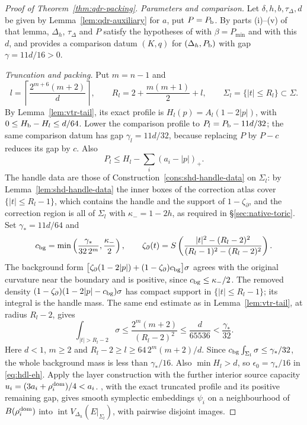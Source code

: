 \begin{proof}[Proof of Theorem~\ref{thm:qdr-packing}]
\emph{Parameters and comparison.} Let $\delta,h,b,\tau_\Delta,d$ be given by Lemma~\ref{lem:qdr-auxiliary} for $a$, put $P=P_{\mathrm b}$. By
parts (i)--(v) of that lemma, $\Delta_h$, $\tau_\Delta$ and $P$ satisfy the hypotheses of 
with $\beta=P_{\min}$ and with this $d$, and  provides a comparison datum $(K,q)$ for $(\Delta_h,P_{\mathrm b})$
with gap $\gamma=11d/16>0$.

\emph{Truncation and packing.} Put $m=n-1$ and
\[
 l=\left\lceil\frac{2^{m+6}(m+2)}d\right\rceil,\qquad
 R_l=2+\frac{m(m+1)}2+l,\qquad \Sigma_l=\{|t|\le R_l\}\subset\Sigma.
\]
By Lemma~\ref{lem:vtr-tail}, its exact profile is $H_l(p)=A_l(1-2|p|)$, with $0\le H_{\mathrm b}-H_l\le d/64$. Lower the comparison profile to
$P_l=P_{\mathrm b}-11d/32$; the same comparison datum has gap $\gamma_l=11d/32$, because replacing $P$ by $P-c$ reduces its gap by $c$. Also
\[
 P_l\le H_l-\sum_i(a_i-|p|)_+.
\]
The handle data are those of Construction~\ref{cons:shd-handle-data} on $\Sigma_l$: by Lemma~\ref{lem:shd-handle-data} the inner
boxes of the correction atlas cover $\{|t|\le R_l-1\}$, which contains the handle and the support of $1-\zeta_\partial$, and the
correction region is all of $\Sigma_l$ with $\kappa_-=1-2h$, as required in \S\ref{sec:native-toric}. Set $\gamma_*=11d/64$ and
\[
 c_{\rm bg}=\min\left(\frac{\gamma_*}{32\,2^m},\frac{\kappa_-}{2}\right),\qquad
 \zeta_\partial(t)=S\left(\frac{|t|^2-(R_l-2)^2}{(R_l-1)^2-(R_l-2)^2}\right).
\]
The background form $\big[\zeta_\partial(1-2|p|)+(1-\zeta_\partial)c_{\rm bg}\big]\sigma$ agrees with the original curvature near
the boundary and is positive, since $c_{\rm bg}\le\kappa_-/2$. The removed density $(1-\zeta_\partial)(1-2|p|-c_{\rm bg})\sigma$ has
compact support in $\{|t|\le R_l-1\}$; its integral is the handle mass. The same end estimate as in Lemma~\ref{lem:vtr-tail}, at
radius $R_l-2$, gives
\[
 \int_{|t|>R_l-2}\sigma\le\frac{2^m(m+2)}{(R_l-2)^2}
 \le\frac{d}{65536}<\frac{\gamma_*}{32}.
\]
Here $d<1$, $m\ge2$ and $R_l-2\ge l\ge64\,2^m(m+2)/d$. Since $c_{\rm bg}\int_{\Sigma_l}\sigma\le\gamma_*/32$, the whole background
mass is less than $\gamma_*/16$. Also $\min H_l>d$, so $\epsilon_0=\gamma_*/16$ in \eqref{eq:hdl-eh}. Apply the layer construction
with the further interior source capacity $u_i=(3a_i+\rho_i^{\rm dom})/4<a_i$. , with the exact
truncated profile and its positive remaining gap, gives smooth symplectic embeddings $\psi_i$ on a neighbourhood of $B(\rho_i^{\rm
dom})$ into $\operatorname{int}V_{\Delta_h}(E|_{\Sigma_l})$, with pairwise disjoint images.


\end{proof}
